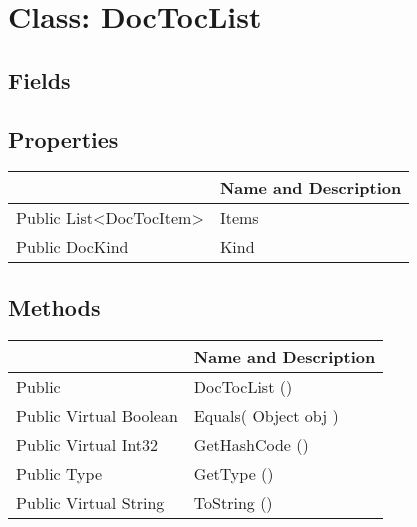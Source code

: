 \documentclass[11pt, oneside, a4paper]{book}
\begin{document}
\hypertarget{SoftwareEngineeringTools.{}Documentation.{}DocTocList}{}
\section{Class: DocTocList}

\subsection{Fields}

\subsection{Properties}
\begin{center}
\begin{tabular}{| p{3cm} | p{12cm} | }
\hline
\textbf{ } & \textbf{ Name and Description}\\
\hline
 Public  List<DocTocItem> &  Items\hypertarget{SoftwareEngineeringTools.{}Documentation.{}DocTocList.{}Items}{}\\
\hline
 Public  DocKind &  Kind\hypertarget{SoftwareEngineeringTools.{}Documentation.{}DocTocList.{}Kind}{}\\
\hline
\end{tabular}
\end{center}

\subsection{Methods}
\begin{center}
\begin{tabular}{| p{3cm} | p{12cm} | }
\hline
\textbf{ } & \textbf{ Name and Description}\\
\hline
 Public  &  DocTocList ()\hypertarget{SoftwareEngineeringTools.{}Documentation.{}DocTocList.{}DocTocList}{}\\
\hline
 Public  Virtual  Boolean &  Equals(\hypertarget{SoftwareEngineeringTools.{}Documentation.{}DocTocList.{}Equals\_Object}{} Object  obj  )\\
\hline
 Public  Virtual  Int32 &  GetHashCode ()\hypertarget{SoftwareEngineeringTools.{}Documentation.{}DocTocList.{}GetHashCode}{}\\
\hline
 Public  Type &  GetType ()\hypertarget{SoftwareEngineeringTools.{}Documentation.{}DocTocList.{}GetType}{}\\
\hline
 Public  Virtual  String &  ToString ()\hypertarget{SoftwareEngineeringTools.{}Documentation.{}DocTocList.{}ToString}{}\\
\hline
\end{tabular}
\end{center}
 
\end{document}
